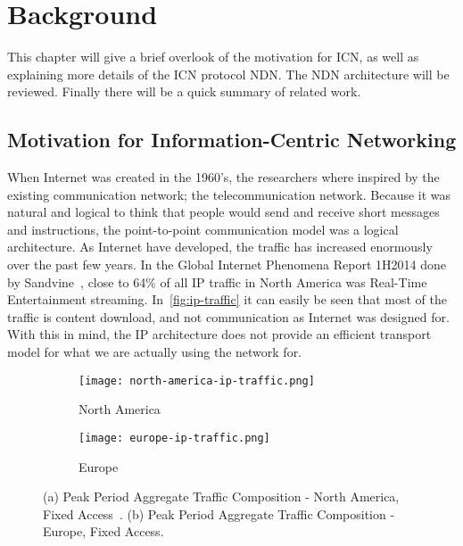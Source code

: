 \chapter{Background}\label{chp:background} 

This chapter will give a brief overlook of the motivation for \gls{ICN}, as well as explaining more details of the \gls{ICN} protocol \gls{NDN}.
The \gls{NDN} architecture will be reviewed.
Finally there will be a quick summary of related work.

\section{Motivation for Information-Centric Networking}
When Internet was created in the 1960's, the researchers where inspired by the existing communication network; the telecommunication network.
Because it was natural and logical to think that people would send and receive short messages and instructions, the point-to-point communication model was a logical architecture. 
As Internet have developed, the traffic has increased enormously over the past few years. 
In the Global Internet Phenomena Report 1H2014 done by Sandvine~\cite{gipr2014}, close to 64\% of all \gls{IP} traffic in North America was Real-Time Entertainment streaming.
In~\autoref{fig:ip-traffic} it can easily be seen that most of the traffic is content download, and not communication as Internet was designed for.
With this in mind, the \gls{IP} architecture does not provide an efficient transport model for what we are actually using the network for.

\begin{figure}[ht]
  \centering
  \begin{subfigure}{0.5\textwidth}
    \centering
    \texttt{[image: north-america-ip-traffic.png]}
    \caption{North America}
    \label{fig:north-america-ip-traffic}
  \end{subfigure}%
  \begin{subfigure}{0.5\textwidth}
    \centering
    \texttt{[image: europe-ip-traffic.png]}
    \caption{Europe}
    \label{fig:europe-ip-traffic}
  \end{subfigure}
  \caption{
  (a) Peak Period Aggregate Traffic Composition - North America, Fixed Access~\cite{gipr2014}.
  (b) Peak Period Aggregate Traffic Composition - Europe, Fixed Access.
  }
  \label{fig:ip-traffic}
\end{figure}

